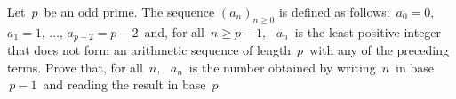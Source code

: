 Let $\, p \,$ be an odd prime.  The sequence $(a_n)_{n \geq 0}$ is defined as follows: $\, a_0 = 0,$ $a_1 = 1, \, \ldots, \, a_{p-2} = p-2 \,$ and, for all $\, n \geq p-1, \,$ $\, a_n \,$ is the least positive integer that does not form an arithmetic sequence of length $\, p \,$ with any of the preceding terms. Prove that, for all $\, n, \,$ $\, a_n \,$ is the number obtained by writing $\, n \,$ in base $\, p-1 \,$ and reading the result in base $\, p$.